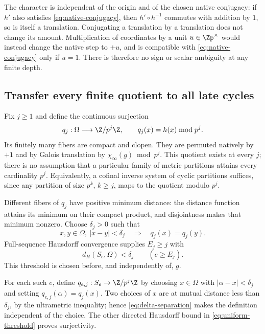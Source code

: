 The character is independent of the origin and of the chosen
native conjugacy: if \(h'\) also satisfies
\eqref{eq:native-conjugacy}, then \(h'\circ h^{-1}\) commutes
with addition by \(1\), so is itself a translation.
Conjugating a translation by a translation does not change
its amount. Multiplication of coordinates by a unit
\(u\in\Zp^\times\) would instead change the native step to
\(+u\), and is compatible with \eqref{eq:native-conjugacy}
only if \(u=1\). There is therefore no sign or scalar
ambiguity at any finite depth.

\subsection{Transfer every finite quotient to all late cycles}

Fix \(j\ge1\) and define the continuous surjection
\[
 q_j:\Omega\longrightarrow\Z/p^j\Z,\qquad
 q_j(x)=h(x)\bmod p^j.
\]
Its finitely many fibers are compact and clopen.
They are permuted natively by \(+1\) and by Galois
translation by \(\chi_\infty(g)\bmod p^j\).
This quotient exists at every \(j\); there is no assumption
that a particular family of metric partitions attains every
cardinality \(p^j\). Equivalently, a cofinal inverse system
of cyclic partitions suffices, since any partition of size
\(p^k\), \(k\ge j\), maps to the quotient modulo \(p^j\).

Different fibers of \(q_j\) have positive minimum distance:
the distance function attains its minimum on their compact
product, and disjointness makes that minimum nonzero.
Choose \(\delta_j>0\) such that
\begin{equation}\label{eq:delta-separation}
 x,y\in\Omega,\ |x-y|<\delta_j
 \quad\Longrightarrow\quad q_j(x)=q_j(y).
\end{equation}
Full-sequence Hausdorff convergence supplies \(E_j\ge j\)
with
\begin{equation}\label{eq:uniform-threshold}
 d_H(S_e,\Omega)<\delta_j\qquad(e\ge E_j).
\end{equation}
This threshold is chosen before, and independently of, \(g\).

For each such \(e\), define \(q_{e,j}:S_e\to\Z/p^j\Z\)
by choosing \(x\in\Omega\) with \(|\alpha-x|<\delta_j\)
and setting \(q_{e,j}(\alpha)=q_j(x)\).
Two choices of \(x\) are at mutual distance less than
\(\delta_j\), by the ultrametric inequality; hence
\eqref{eq:delta-separation} makes the definition independent
of the choice. The other directed Hausdorff bound in
\eqref{eq:uniform-threshold} proves surjectivity.

